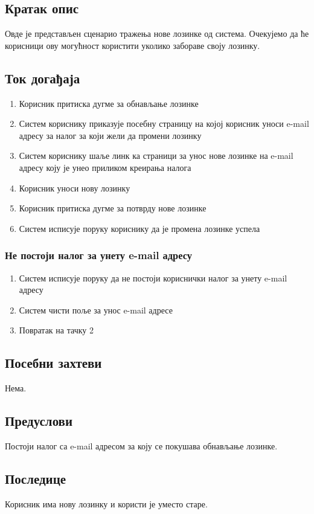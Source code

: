 \subsection{Кратак опис}
Овде је представљен сценарио тражења нове лозинке од система. Очекујемо да ће корисници ову
могућност користити уколико забораве своју лозинку.

\subsection{Ток догађаја}
\begin{enumerate}
	\item Корисник притиска дугме за обнављање лозинке
	\item Систем кориснику приказује посебну страницу на којој корисник уноси e-mail
		  адресу за налог за који жели да промени лозинку
	\item Систем кориснику шаље линк ка страници за унос нове лозинке на e-mail адресу коју је
	      унео приликом креирања налога
	\item Корисник уноси нову лозинку
	\item Корисник притиска дугме за потврду нове лозинке
	\item Систем исписује поруку кориснику да је промена лозинке успела
\end{enumerate}

\subsubsection{Не постоји налог за унету e-mail адресу}
\begin{enumerate}[label=2.\arabic*]
	\item Систем исписује поруку да не постоји кориснички налог за унету e-mail адресу
	\item Систем чисти поље за унос e-mail адресе
	\item Повратак на тачку 2
\end{enumerate}


\subsection{Посебни захтеви}
Нема.

\subsection{Предуслови}
Постоји налог са e-mail адресом за коју се покушава обнављање лозинке.

\subsection{Последице}
Корисник има нову лозинку и користи је уместо старе.
